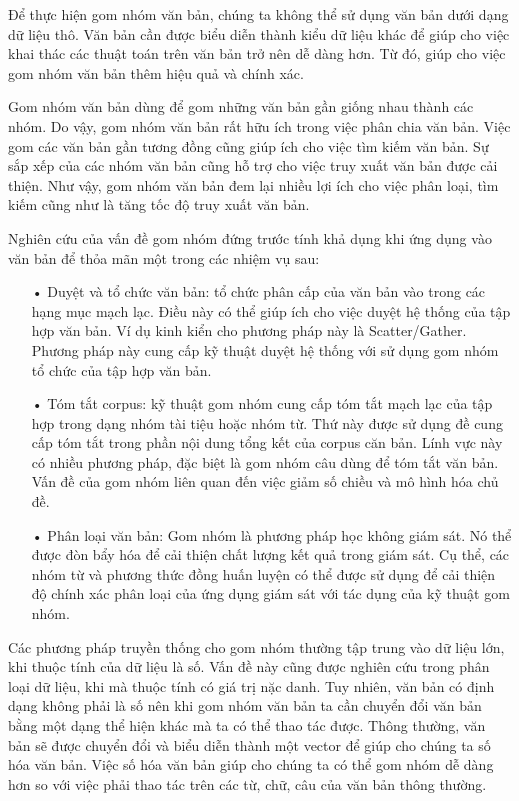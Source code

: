Để thực hiện gom nhóm văn bản, chúng ta không thể sử dụng văn bản dưới dạng dữ liệu thô.
Văn bản cần được biểu diễn thành kiểu dữ liệu khác để giúp cho việc khai thác các thuật toán trên văn bản trở nên dễ dàng hơn.
Từ đó, giúp cho việc gom nhóm văn bản thêm hiệu quả và chính xác.


Gom nhóm văn bản dùng để gom những văn bản gần giống nhau thành các nhóm. 
Do vậy, gom nhóm văn bản rất hữu ích trong việc phân chia văn bản.
Việc gom các văn bản gần tương đồng cũng giúp ích cho việc tìm kiếm văn bản.
Sự sắp xếp của các nhóm văn bản cũng hỗ trợ cho việc truy xuất văn bản được cải thiện.
Như vậy, gom nhóm văn bản đem lại nhiều lợi ích cho việc phân loại, tìm kiếm cũng như là tăng tốc độ truy xuất văn bản.


Nghiên cứu của vấn đề gom nhóm đứng trước tính khả dụng khi ứng dụng vào văn bản để thỏa mãn một trong các nhiệm vụ sau:
\begin{enumerate}
\item[•]Duyệt và tổ chức văn bản: tổ chức phân cấp của văn bản vào trong các hạng mục mạch lạc.
Điều này có thể giúp ích cho việc duyệt hệ thống của tập hợp văn bản.
Ví dụ kinh kiển cho phương pháp này là Scatter/Gather.
Phương pháp này cung cấp kỹ thuật duyệt hệ thống với sử dụng gom nhóm tổ chức của tập hợp văn bản.
\item[•]Tóm tắt corpus: kỹ thuật gom nhóm cung cấp tóm tắt mạch lạc của tập hợp trong dạng nhóm tài tiệu hoặc nhóm từ.
Thứ này được sử dụng đề cung cấp tóm tắt trong phần nội dung tổng kết của corpus căn bản.
Lính vực này có nhiều phương pháp, đặc biệt là gom nhóm câu dùng để tóm tắt văn bản.
Vấn đề của gom nhóm liên quan đến việc giảm số chiều và mô hình hóa chủ đề. 
\item[•]Phân loại văn bản: Gom nhóm là phương pháp học không giám sát.
Nó thể được đòn bẩy hóa để cải thiện chất lượng kết quả trong giám sát.
Cụ thể, các nhóm từ và phương thức đồng huấn luyện có thể được sử dụng để cải thiện độ chính xác phân loại của ứng dụng giám sát với tác dụng của kỹ thuật gom nhóm.
\end{enumerate}

Các phương pháp truyền thống cho gom nhóm thường tập trung vào dữ liệu lớn, khi thuộc tính của dữ liệu là số.
Vấn đề này cũng được nghiên cứu trong phân loại dữ liệu, khi mà thuộc tính có giá trị nặc danh.
Tuy nhiên, văn bản có định dạng không phải là số nên khi gom nhóm văn bản ta cần chuyển đổi văn bản bằng một dạng thể hiện khác mà ta có thể thao tác được.
Thông thường, văn bản sẽ được chuyển đổi và biểu diễn thành một vector để giúp cho chúng ta số hóa văn bản.
Việc số hóa văn bản giúp cho chúng ta có thể gom nhóm dễ dàng hơn so với việc phải thao tác trên các từ, chữ, câu của văn bản thông thường.

